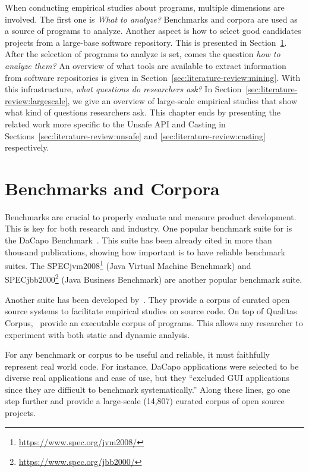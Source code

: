 When conducting empirical studies about programs,
multiple dimensions are involved.
The first one is \emph{What to analyze?}
Benchmarks and corpora are used as a source of programs to analyze.
Another aspect is how to select good candidates projects from a large-base software repository.
This is presented in Section~\ref{sec:literature-review:benchmarks}.
After the selection of programs to analyze is set,
comes the question \emph{how to analyze them?}
An overview of what tools are available to extract information from software repositories is given in Section~\ref{sec:literature-review:mining}.
With this infrastructure, \emph{what questions do researchers ask?}
In Section~\ref{sec:literature-review:largescale},
we give an overview of large-scale empirical studies that show what kind of questions researchers ask.
This chapter ends by presenting the related work more specific to the Unsafe API and Casting in Sections~\ref{sec:literature-review:unsafe} and \ref{sec:literature-review:casting} respectively.


\section{Benchmarks and Corpora}
\label{sec:literature-review:benchmarks}

Benchmarks are crucial to properly evaluate and measure product development.
This is key for both research and industry.
One popular benchmark suite for \java{} is the DaCapo Benchmark~\citep{blackburnDaCapoBenchmarksJava2006}.
This suite has been already cited in more than thousand publications, showing how important is to have reliable benchmark suites.
The SPECjvm2008\footnote{\url{https://www.spec.org/jvm2008/}}
(Java Virtual Machine Benchmark)
and
SPECjbb2000\footnote{\url{https://www.spec.org/jbb2000/}}
(Java Business Benchmark)
are another popular \java{} benchmark suite.

Another suite has been developed by~\cite{temperoQualitasCorpusCurated2010}.
They provide a corpus of curated open source systems to facilitate empirical studies on source code.
On top of Qualitas Corpus,~\cite{dietrichXCorpusExecutableCorpus2017} provide an executable corpus of \java{} programs.
This allows any researcher to experiment with both static and dynamic analysis.

For any benchmark or corpus to be useful and reliable,
it must faithfully represent real world code.
For instance,
DaCapo applications were selected to be diverse real applications and
ease of use, but they ``excluded GUI applications since they are difficult
to benchmark systematically.''
Along these lines, \cite{allamanisMiningSourceCode2013} go one step further and provide a large-scale (14,807) curated corpus of open source \java{} projects.

